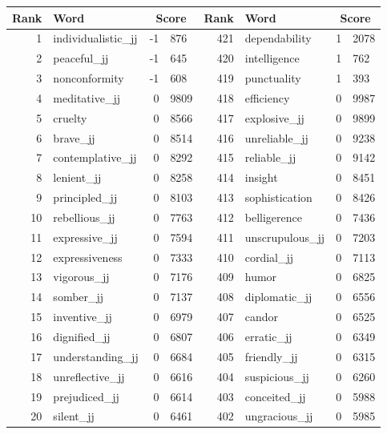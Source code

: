 \begin{table}[tbp]
    \begin{tabular}{| rlr@{.}l | rlr@{.}l |}
    \hline
    \textbf{Rank} & \textbf{Word} & \multicolumn{2}{c|}{\textbf{Score}} & \textbf{Rank} & \textbf{Word} & \multicolumn{2}{c|}{\textbf{Score}} \\
    \hline
    1 & individualistic\_jj & -1 & 876    &    421 & dependability & 1 & 2078 \\
    2 & peaceful\_jj & -1 & 645    &    420 & intelligence & 1 & 762 \\
    3 & nonconformity & -1 & 608    &    419 & punctuality & 1 & 393 \\
    4 & meditative\_jj & 0 & 9809    &    418 & efficiency & 0 & 9987 \\
    5 & cruelty & 0 & 8566    &    417 & explosive\_jj & 0 & 9899 \\
    6 & brave\_jj & 0 & 8514    &    416 & unreliable\_jj & 0 & 9238 \\
    7 & contemplative\_jj & 0 & 8292    &    415 & reliable\_jj & 0 & 9142 \\
    8 & lenient\_jj & 0 & 8258    &    414 & insight & 0 & 8451 \\
    9 & principled\_jj & 0 & 8103    &    413 & sophistication & 0 & 8426 \\
    10 & rebellious\_jj & 0 & 7763    &    412 & belligerence & 0 & 7436 \\
    11 & expressive\_jj & 0 & 7594    &    411 & unscrupulous\_jj & 0 & 7203 \\
    12 & expressiveness & 0 & 7333    &    410 & cordial\_jj & 0 & 7113 \\
    13 & vigorous\_jj & 0 & 7176    &    409 & humor & 0 & 6825 \\
    14 & somber\_jj & 0 & 7137    &    408 & diplomatic\_jj & 0 & 6556 \\
    15 & inventive\_jj & 0 & 6979    &    407 & candor & 0 & 6525 \\
    16 & dignified\_jj & 0 & 6807    &    406 & erratic\_jj & 0 & 6349 \\
    17 & understanding\_jj & 0 & 6684    &    405 & friendly\_jj & 0 & 6315 \\
    18 & unreflective\_jj & 0 & 6616    &    404 & suspicious\_jj & 0 & 6260 \\
    19 & prejudiced\_jj & 0 & 6614    &    403 & conceited\_jj & 0 & 5988 \\
    20 & silent\_jj & 0 & 6461    &    402 & ungracious\_jj & 0 & 5985 \\

\end{tabular}
\end{table}
